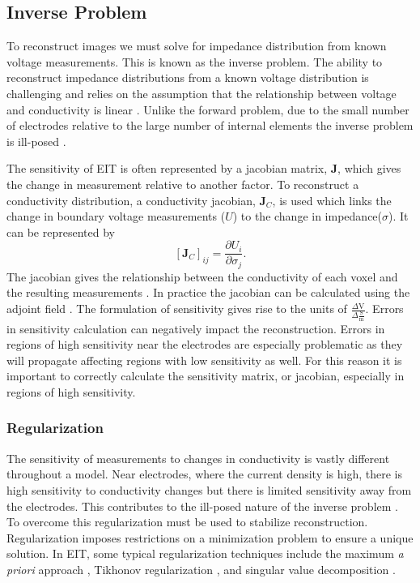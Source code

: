 \subsection{Inverse Problem} \label{sec:inv_prob}
To reconstruct images we must solve for impedance distribution from known voltage measurements. 
This is known as the inverse problem. 
The ability to reconstruct impedance distributions from a known voltage distribution is challenging 
and relies on the assumption that the relationship between voltage and conductivity is 
linear \parencite{barber_applied_1984}.
Unlike the forward problem, due to the small number of electrodes 
relative to the large number of internal elements the inverse problem is
ill-posed \parencite{holder_electrical_2004}.

The sensitivity of EIT is often represented by a jacobian matrix, $\mathbf{J}$,
which gives the change in measurement relative to another factor. To reconstruct 
a conductivity distribution, a conductivity jacobian, $\mathbf{J}_C$, is used
which links the change 
in boundary voltage measurements ($U$) to the change in impedance($\sigma$). It can be represented by 
\begin{equation} \label{eq:jacobian_c}
	[\mathbf{J}_C]_{ij} = \frac{\partial U_i}{\partial \sigma_j}. 
\end{equation}
The jacobian gives the relationship between the conductivity of each voxel and the resulting
measurements \parencite{holder_electrical_2004}.
In practice the jacobian can be calculated using the adjoint 
field \parencite{vauhkonen_three-dimensional_1999}. The formulation of sensitivity gives rise to 
the units of $\frac{\Delta \text{V}}{\Delta \frac{\text{S}}{\text{m}}}$. Errors in sensitivity 
calculation can negatively impact the reconstruction. Errors in regions of high sensitivity near
the electrodes are especially problematic as they will propagate affecting regions with low
sensitivity as well. For this reason it is important to correctly calculate the sensitivity matrix,
or jacobian, especially in regions of high sensitivity. 

\subsubsection{Regularization}
The sensitivity of measurements to changes in conductivity is vastly different throughout a model. 
Near electrodes, where the current density is high, there is high sensitivity to conductivity 
changes but there is limited sensitivity away from the electrodes. This contributes 
to the ill-posed nature of the inverse problem \parencite{holder_electrical_2004}.
To overcome this regularization must be used to stabilize reconstruction. 
Regularization imposes restrictions on a minimization problem to ensure a unique solution.
In EIT, some typical regularization techniques include the maximum \emph{a priori} approach
\parencite{adler_electrical_1996}, Tikhonov regularization \parencite{vauhkonen_tikhonov_1998},
and singular value decomposition \parencite{ostebee_rank-deficient_1998}.

